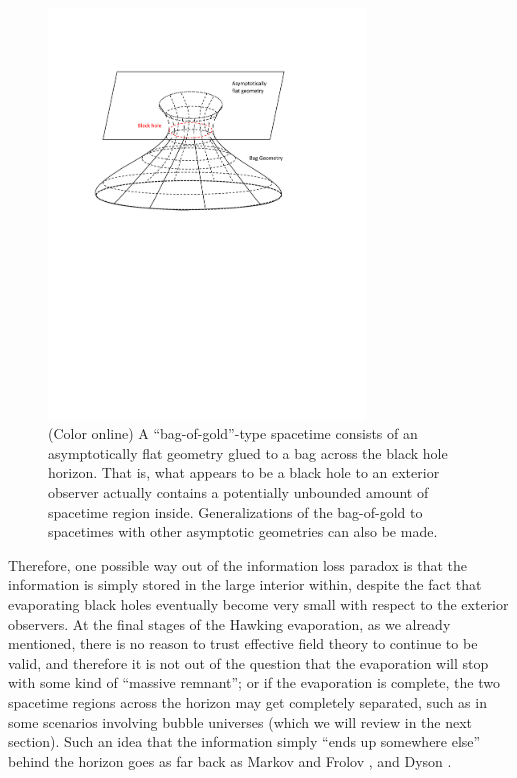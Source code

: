 \documentclass[12pt]{article}
\newcommand{\2}{$^2$}
\newcommand{\3}{$^3$}
\newcommand{\4}{$_4$}
\newcommand{\5}{$_5$}
\begin{document}
\begin{figure}
\centering
    \includegraphics[width=0.75\textwidth]{bag.pdf}
    \caption[A ``bag-of-gold''-type spacetime.]{(Color online) A ``bag-of-gold''-type spacetime consists of an asymptotically flat geometry glued to a bag across the black hole horizon. That is, what appears to be a black hole to an exterior observer actually contains a potentially unbounded amount of spacetime region inside. Generalizations of the bag-of-gold to spacetimes with other asymptotic geometries can also be made. \label{bag}} 
\end{figure}


Therefore, one possible way out of the information loss paradox is that the information is simply stored in the large interior within, despite the fact that evaporating black holes eventually become very small with respect to the exterior observers. At the final stages of the Hawking evaporation, as we already mentioned, there is no reason to trust effective field theory to continue to be valid, and therefore it is not out of the question that the evaporation will stop with some kind of ``massive remnant''; or if the evaporation is complete, the two spacetime regions across the horizon may get completely separated, such as in some scenarios involving bubble universes (which we will review in the next section). Such an idea that the information simply ``ends up somewhere else'' behind the horizon goes as far back as Markov and Frolov \cite{MM0}, and Dyson \cite{dyson}.
\end{document}
